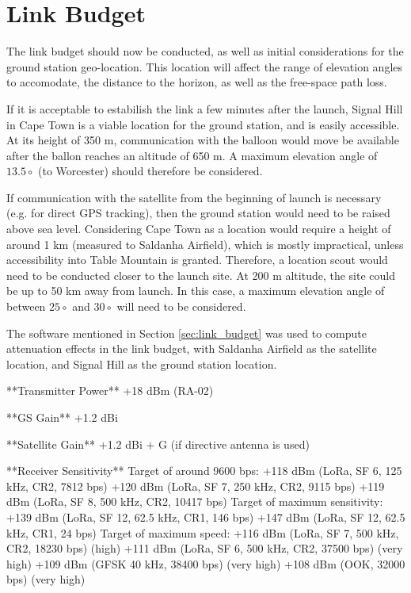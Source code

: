 \section{Link Budget}

The link budget should now be conducted, as well as initial considerations for the ground station geo-location. This location will affect the range of elevation angles to accomodate, the distance to the horizon, as well as the free-space path loss.

If it is acceptable to estabilish the link a few minutes after the launch, Signal Hill in Cape Town is a viable location for the ground station, and is easily accessible. At its height of 350 m, communication with the balloon would move be available after the ballon reaches an altitude of 650 m. A maximum elevation angle of $13.5 \circ$ (to Worcester) should therefore be considered.

If communication with the satellite from the beginning of launch is necessary (e.g. for direct GPS tracking), then the ground station would need to be raised above sea level. Considering Cape Town as a location would require a height of around 1 km (measured to Saldanha Airfield), which is mostly impractical, unless accessibility into Table Mountain is granted. Therefore, a location scout would need to be conducted closer to the launch site. At 200 m altitude, the site could be up to 50 km away from launch. In this case, a maximum elevation angle of between $25 \circ$ and $30 \circ$ will need to be considered.

The software mentioned in Section \ref{sec:link_budget} was used to compute attenuation effects in the link budget, with Saldanha Airfield as the satellite location, and Signal Hill as the ground station location. 

**Transmitter Power**
+18 dBm (RA-02)

**GS Gain**
+1.2 dBi

**Satellite Gain**
+1.2 dBi + G (if directive antenna is used)

**Receiver Sensitivity**
Target of around 9600 bps:
    +118 dBm (LoRa, SF 6, 125 kHz, CR2, 7812 bps)
    +120 dBm (LoRa, SF 7, 250 kHz, CR2, 9115 bps)
    +119 dBm (LoRa, SF 8, 500 kHz, CR2, 10417 bps)
Target of maximum sensitivity:
    +139 dBm (LoRa, SF 12, 62.5 kHz, CR1, 146 bps)
    +147 dBm (LoRa, SF 12, 62.5 kHz, CR1, 24 bps)
Target of maximum speed:
    +116 dBm (LoRa, SF 7, 500 kHz, CR2, 18230 bps) (high)
    +111 dBm (LoRa, SF 6, 500 kHz, CR2, 37500 bps) (very high)
    +109 dBm (GFSK 40 kHz, 38400 bps) (very high)
    +108 dBm (OOK, 32000 bps) (very high)

